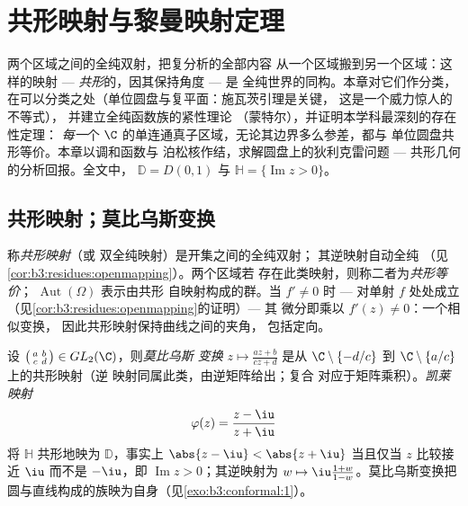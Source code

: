 \chapter{共形映射与黎曼映射定理}
\label{ch:b3:conformal}

两个区域之间的全纯双射，把复分析的全部内容
从一个区域搬到另一个区域：这样的映射 ---
\emph{共形}的，因其保持角度 --- 是
全纯世界的同构。本章对它们作分类，
在可以分类之处（单位圆盘与复平面：施瓦茨引理是关键，
这是一个威力惊人的不等式），
并建立全纯函数族的紧性理论
（蒙特尔），并证明本学科最深刻的存在性定理：
\emph{每一}个
$\C$ 的单连通真子区域，无论其边界多么参差，都与
单位圆盘共形等价。本章以调和函数与
泊松核作结，求解圆盘上的狄利克雷问题 ---
共形几何的分析回报。全文中，
$\mathbb D = D(0,1)$ 与 $\mathbb H = \{\operatorname{Im}z >
0\}$。

\section{共形映射；莫比乌斯变换}

\begin{definition}\label{def:b3:conformal:conformal}
称\emph{共形映射}（或
双全纯映射）是开集之间的全纯双射；
其逆映射自动全纯
（见\cref{cor:b3:residues:openmapping}）。两个区域若
存在此类映射，则称二者为\emph{共形等价}；
$\operatorname{Aut}(\Omega)$ 表示由共形
自映射构成的群。当 $f' \neq 0$ 时 ---
对单射 $f$ 处处成立（见\cref{cor:b3:residues:openmapping}的证明）--- 其
微分即乘以 $f'(z) \neq 0$：一个相似变换，
因此共形映射保持曲线之间的夹角，
包括定向。
\end{definition}

\begin{example}[莫比乌斯变换]
\label{ex:b3:conformal:mobius}
设 $\bigl(\begin{smallmatrix}a & b\\ c &
d\end{smallmatrix}\bigr) \in GL_2(\C)$，则\emph{莫比乌斯
变换} $z \mapsto
\frac{az + b}{cz + d}$ 是从
$\C\setminus\{-d/c\}$ 到 $\C\setminus\{a/c\}$ 上的共形映射（逆
映射同属此类，由逆矩阵给出；复合
对应于矩阵乘积）。\emph{凯莱
映射}
\[
\varphi(z) = \frac{z - \iu}{z + \iu}
\]
将 $\mathbb H$ 共形地映为 $\mathbb D$，事实上 $\abs{z
- \iu} < \abs{z + \iu}$ 当且仅当 $z$ 比较接近 $\iu$
而不是 $-\iu$，即 $\operatorname{Im}z > 0$；其逆映射为
$w \mapsto \iu\frac{1 + w}{1 - w}$。莫比乌斯变换把
圆与直线构成的族映为自身（见\cref{exo:b3:conformal:1}）。
\end{example}

